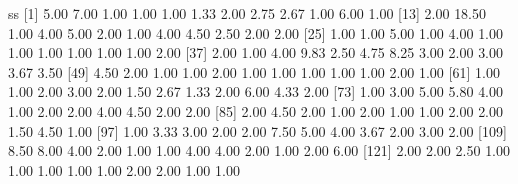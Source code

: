 \documentclass[
]{book}
\newenvironment{Shaded}{\begin{snugshade}}{\end{snugshade}}
\newcommand{\DecValTok}[1]{\textcolor[rgb]{0.00,0.00,0.81}{#1}}
\newcommand{\FloatTok}[1]{\textcolor[rgb]{0.00,0.00,0.81}{#1}}
\newcommand{\NormalTok}[1]{#1}
\begin{document}
\begin{Shaded}
\begin{Highlighting}[]
{{{\NormalTok{ss}
\NormalTok{  [}\DecValTok{1}\NormalTok{]  }\FloatTok{5.00}  \FloatTok{7.00}  \FloatTok{1.00}  \FloatTok{1.00}  \FloatTok{1.00}  \FloatTok{1.33}  \FloatTok{2.00}  \FloatTok{2.75}  \FloatTok{2.67}  \FloatTok{1.00}  \FloatTok{6.00}  \FloatTok{1.00}
\NormalTok{ [}\DecValTok{13}\NormalTok{]  }\FloatTok{2.00} \FloatTok{18.50}  \FloatTok{1.00}  \FloatTok{4.00}  \FloatTok{5.00}  \FloatTok{2.00}  \FloatTok{1.00}  \FloatTok{4.00}  \FloatTok{4.50}  \FloatTok{2.50}  \FloatTok{2.00}  \FloatTok{2.00}
\NormalTok{ [}\DecValTok{25}\NormalTok{]  }\FloatTok{1.00}  \FloatTok{1.00}  \FloatTok{5.00}  \FloatTok{1.00}  \FloatTok{4.00}  \FloatTok{1.00}  \FloatTok{1.00}  \FloatTok{1.00}  \FloatTok{1.00}  \FloatTok{1.00}  \FloatTok{1.00}  \FloatTok{2.00}
\NormalTok{ [}\DecValTok{37}\NormalTok{]  }\FloatTok{2.00}  \FloatTok{1.00}  \FloatTok{4.00}  \FloatTok{9.83}  \FloatTok{2.50}  \FloatTok{4.75}  \FloatTok{8.25}  \FloatTok{3.00}  \FloatTok{2.00}  \FloatTok{3.00}  \FloatTok{3.67}  \FloatTok{3.50}
\NormalTok{ [}\DecValTok{49}\NormalTok{]  }\FloatTok{4.50}  \FloatTok{2.00}  \FloatTok{1.00}  \FloatTok{1.00}  \FloatTok{2.00}  \FloatTok{1.00}  \FloatTok{1.00}  \FloatTok{1.00}  \FloatTok{1.00}  \FloatTok{1.00}  \FloatTok{2.00}  \FloatTok{1.00}
\NormalTok{ [}\DecValTok{61}\NormalTok{]  }\FloatTok{1.00}  \FloatTok{1.00}  \FloatTok{2.00}  \FloatTok{3.00}  \FloatTok{2.00}  \FloatTok{1.50}  \FloatTok{2.67}  \FloatTok{1.33}  \FloatTok{2.00}  \FloatTok{6.00}  \FloatTok{4.33}  \FloatTok{2.00}
\NormalTok{ [}\DecValTok{73}\NormalTok{]  }\FloatTok{1.00}  \FloatTok{3.00}  \FloatTok{5.00}  \FloatTok{5.80}  \FloatTok{4.00}  \FloatTok{1.00}  \FloatTok{2.00}  \FloatTok{2.00}  \FloatTok{4.00}  \FloatTok{4.50}  \FloatTok{2.00}  \FloatTok{2.00}
\NormalTok{ [}\DecValTok{85}\NormalTok{]  }\FloatTok{2.00}  \FloatTok{4.50}  \FloatTok{2.00}  \FloatTok{1.00}  \FloatTok{2.00}  \FloatTok{1.00}  \FloatTok{1.00}  \FloatTok{2.00}  \FloatTok{2.00}  \FloatTok{1.50}  \FloatTok{4.50}  \FloatTok{1.00}
\NormalTok{ [}\DecValTok{97}\NormalTok{]  }\FloatTok{1.00}  \FloatTok{3.33}  \FloatTok{3.00}  \FloatTok{2.00}  \FloatTok{2.00}  \FloatTok{7.50}  \FloatTok{5.00}  \FloatTok{4.00}  \FloatTok{3.67}  \FloatTok{2.00}  \FloatTok{3.00}  \FloatTok{2.00}
\NormalTok{[}\DecValTok{109}\NormalTok{]  }\FloatTok{8.50}  \FloatTok{8.00}  \FloatTok{4.00}  \FloatTok{2.00}  \FloatTok{1.00}  \FloatTok{1.00}  \FloatTok{4.00}  \FloatTok{4.00}  \FloatTok{2.00}  \FloatTok{1.00}  \FloatTok{2.00}  \FloatTok{6.00}
\NormalTok{[}\DecValTok{121}\NormalTok{]  }\FloatTok{2.00}  \FloatTok{2.00}  \FloatTok{2.50}  \FloatTok{1.00}  \FloatTok{1.00}  \FloatTok{1.00}  \FloatTok{1.00}  \FloatTok{1.00}  \FloatTok{2.00}  \FloatTok{2.00}  \FloatTok{1.00}  \FloatTok{1.00}
}}}
\end{Highlighting}
\end{Shaded}
\end{document}
